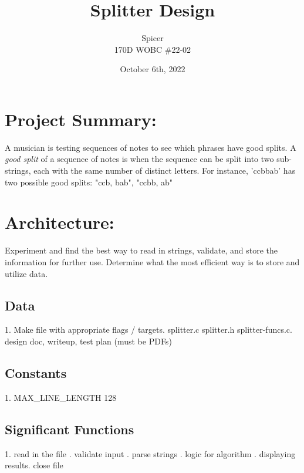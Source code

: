 \documentclass[12pt]{article}
\begin{document}
\title{Splitter Design}
\author{\Kyle Spicer\\ 170D WOBC \#22-02}
\date{October 6th, 2022}

\maketitle

\section{Project Summary:}\label{Project Summary}
A musician is testing sequences of notes to see which phrases have good splits. A \textit{good split} of a sequence of notes is when the sequence can be split into two sub-strings, each with the same number of distinct letters. 
\newline\newline
For instance, 'ccbbab' has two possible good splits: "ccb, bab", "ccbb, ab"


\section{Architecture:}\label{Architecture}
Experiment and find the best way to read in strings, validate, and store the information for further use. Determine what the most efficient way is to store and utilize data.
\subsection{Data}
1. Make file with appropriate flags / targets. splitter.c splitter.h splitter-funcs.c. design doc, writeup, test plan (must be PDFs)\newline

\subsection{Constants}
1. MAX\_LINE\_LENGTH 128

\subsection{Significant Functions}
1. read in the file . validate input . parse strings . logic for algorithm . displaying results. close file
\end{document}
